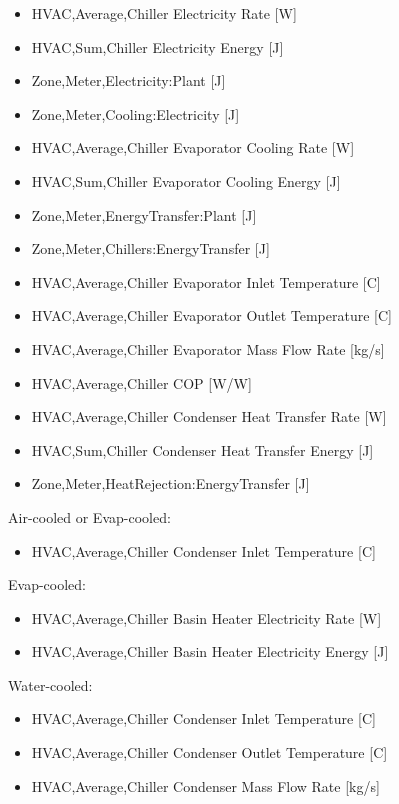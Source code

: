 \begin{itemize}
    \item
    HVAC,Average,Chiller Electricity Rate {[}W{]}
    \item
    HVAC,Sum,Chiller Electricity Energy {[}J{]}
    \item
    Zone,Meter,Electricity:Plant {[}J{]}
    \item
    Zone,Meter,Cooling:Electricity {[}J{]}
    \item
    HVAC,Average,Chiller Evaporator Cooling Rate {[}W{]}
    \item
    HVAC,Sum,Chiller Evaporator Cooling Energy {[}J{]}
    \item
    Zone,Meter,EnergyTransfer:Plant {[}J{]}
    \item
    Zone,Meter,Chillers:EnergyTransfer {[}J{]}
    \item
    HVAC,Average,Chiller Evaporator Inlet Temperature {[}C{]}
    \item
    HVAC,Average,Chiller Evaporator Outlet Temperature {[}C{]}
    \item
    HVAC,Average,Chiller Evaporator Mass Flow Rate {[}kg/s{]}
    \item
    HVAC,Average,Chiller COP {[}W/W{]}
    \item
    HVAC,Average,Chiller Condenser Heat Transfer Rate {[}W{]}
    \item
    HVAC,Sum,Chiller Condenser Heat Transfer Energy {[}J{]}
    \item
    Zone,Meter,HeatRejection:EnergyTransfer {[}J{]}
\end{itemize}

Air-cooled or Evap-cooled:

\begin{itemize}
    \tightlist
    \item
    HVAC,Average,Chiller Condenser Inlet Temperature {[}C{]}
\end{itemize}

Evap-cooled:

\begin{itemize}
    \item
    HVAC,Average,Chiller Basin Heater Electricity Rate {[}W{]}
    \item
    HVAC,Average,Chiller Basin Heater Electricity Energy {[}J{]}
\end{itemize}

Water-cooled:

\begin{itemize}
    \item
    HVAC,Average,Chiller Condenser Inlet Temperature {[}C{]}
    \item
    HVAC,Average,Chiller Condenser Outlet Temperature {[}C{]}
    \item
    HVAC,Average,Chiller Condenser Mass Flow Rate {[}kg/s{]}
\end{itemize}

